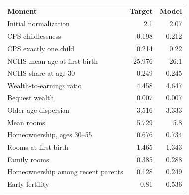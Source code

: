 \begin{tabular}{lrr}
\toprule
Moment & Target & Model \\
\midrule
Initial normalization & 2.1 & 2.07 \\
CPS childlessness & 0.198 & 0.212 \\
CPS exactly one child & 0.214 & 0.22 \\
NCHS mean age at first birth & 25.976 & 26.1 \\
NCHS share at age 30 & 0.249 & 0.245 \\
Wealth-to-earnings ratio & 4.458 & 4.647 \\
Bequest wealth & 0.007 & 0.007 \\
Older-age dispersion & 3.516 & 3.333 \\
Mean rooms & 5.729 & 5.8 \\
Homeownership, ages 30--55 & 0.676 & 0.734 \\
Rooms at first birth & 1.465 & 1.343 \\
Family rooms & 0.385 & 0.288 \\
Homeownership among recent parents & 0.128 & 0.249 \\
Early fertility & 0.81 & 0.536 \\
\bottomrule
\end{tabular}
